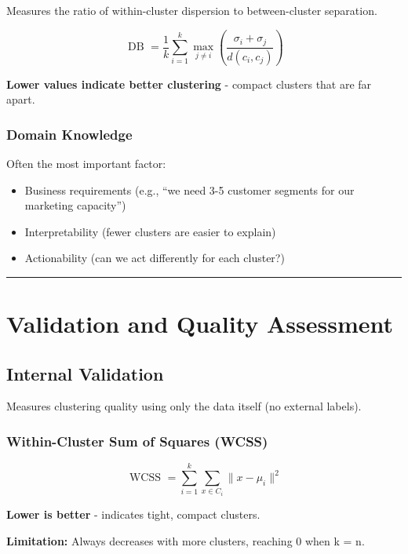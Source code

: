 \documentclass[
]{article}
\begin{document}
Measures the ratio of within-cluster dispersion to between-cluster
separation.

\[\text{ DB } = \frac{1}{k}\sum_{i = 1}^{k}\max\limits_{j \neq i}\left( \frac{\sigma_{i} + \sigma_{j}}{d\left( c_{i},c_{j} \right)} \right)\]

\textbf{Lower values indicate better clustering} - compact clusters that
are far apart.

\subsubsection{Domain Knowledge}

Often the most important factor:

\begin{itemize}
\item
  Business requirements (e.g., ``we need 3-5 customer segments for our
  marketing capacity'')
\item
  Interpretability (fewer clusters are easier to explain)
\item
  Actionability (can we act differently for each cluster?)
\end{itemize}

\begin{center}\rule{0.5\linewidth}{0.5pt}\end{center}

\textbf{ }

\section{Validation and Quality Assessment}

\textbf{ }

\subsection{Internal Validation}

Measures clustering quality using only the data itself (no external
labels).

\subsubsection{Within-Cluster Sum of Squares (WCSS)}

\[\text{ WCSS } = \sum_{i = 1}^{k}\sum_{x \in C_{i}}\| x - \mu_{i}\|^{2}\]

\textbf{Lower is better} - indicates tight, compact clusters.

\textbf{Limitation:} Always decreases with more clusters, reaching 0
when k = n.
\end{document}
